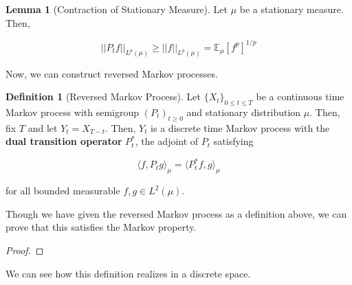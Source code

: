 \documentclass{article}
\theoremstyle{definition}
\newtheorem{lemma}[theorem]{Lemma}
\theoremstyle{remark}
\theoremstyle{definition}
\newtheorem{definition}{Definition}[section]
\begin{document}
      \begin{lemma}[Contraction of Stationary Measure]
        Let $\mu$ be a stationary measure. Then, 

          \[||P_t f||_{L^p(\mu)} \geq ||f||_{L^p (\mu)} = \mathbb{E}_\mu [f^p]^{1/p}\]
      \end{lemma}

      Now, we can construct reversed Markov processes. 

      \begin{definition}[Reversed Markov Process]
        Let $\{X_t\}_{0 \leq t \leq T}$ be a continuous time Markov process with semigroup $(P_t)_{t \geq 0}$ and stationary distribution $\mu$. Then, fix $T$ and let $Y_t = X_{T - t}$. Then, $Y_t$ is a discrete time Markov process with the \textbf{dual transition operator} $P_t^*$, the adjoint of $P_t$ satisfying 

          \[\langle f, P_t g \rangle_\mu = \langle P_t^* f, g \rangle_\mu\]

        for all bounded measurable $f, g \in L^2 (\mu)$. 
      \end{definition}

      Though we have given the reversed Markov process as a definition above, we can prove that this satisfies the Markov property. 

      \begin{proof}

      \end{proof}

      We can see how this definition realizes in a discrete space. 
\end{document}
